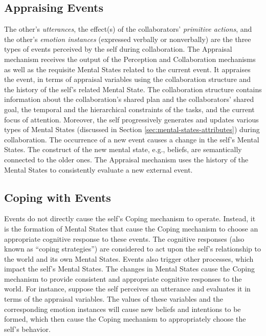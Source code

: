 \documentclass[12pt]{report}
\begin{document}
\subsection{Appraising Events}
\label{sec:appraisal-event}

The other's \textit{utterances}, the effect(s) of the collaborators'
\textit{primitive actions}, and the other's \textit{emotion instances}
(expressed verbally or nonverbally) are the three types of events perceived by
the self during collaboration. The Appraisal mechanism receives the output of
the Perception and Collaboration mechanisms as well as the requisite Mental
States related to the current event. It appraises the event, in terms of
appraisal variables using the collaboration structure and the history of the
self's related Mental State. The collaboration structure contains information
about the collaboration's shared plan and the collaborators' shared goal, the
temporal and the hierarchical constraints of the tasks, and the current focus of
attention. Moreover, the self progressively generates and updates various types
of Mental States (discussed in Section \ref{sec:mental-states-attributes})
during collaboration. The occurrence of a new event causes a change in the
self's Mental States. The construct of the new mental state, e.g., beliefs, are
semantically connected to the older ones. The Appraisal mechanism uses the
history of the Mental States to consistently evaluate a new external event.

\subsection{Coping with Events}

Events do not directly cause the self's Coping mechanism to operate. Instead, it
is the formation of Mental States that cause the Coping mechanism to choose an
appropriate cognitive response to these events. The cognitive responses (also
known as ``coping strategies'') are considered to act upon the self's
relationship to the world and its own Mental States. Events also trigger other
processes, which impact the self's Mental States. The changes in Mental States
cause the Coping mechanism to provide consistent and appropriate cognitive
responses to the world. For instance, suppose the self perceives an utterance
and evaluates it in terms of the appraisal variables. The values of these
variables and the corresponding emotion instances will cause new beliefs and
intentions to be formed, which then cause the Coping mechanism to appropriately
choose the self's behavior.
\end{document}
